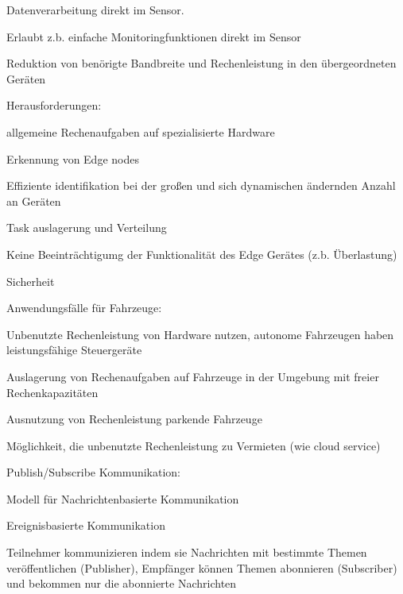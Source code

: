 \begin{notes}
\begin{notes}
\begin{notes}
            \item Datenverarbeitung direkt im Sensor.
            \item Erlaubt z.b. einfache Monitoringfunktionen direkt im Sensor
            \item Reduktion von benörigte Bandbreite und Rechenleistung in den übergeordneten Geräten
        \end{notes}
        \item Herausforderungen:
        \begin{notes}
            \item allgemeine Rechenaufgaben auf spezialisierte Hardware
            \item Erkennung von Edge nodes
            \item Effiziente identifikation bei der großen und sich dynamischen ändernden Anzahl an Geräten
            \item Task auslagerung und Verteilung
            \item Keine Beeinträchtigumg der Funktionalität des Edge Gerätes (z.b. Überlastung)
            \item Sicherheit
        \end{notes}
        \item Anwendungsfälle für Fahrzeuge:
            \begin{notes}
                \item Unbenutzte Rechenleistung von Hardware nutzen, autonome Fahrzeugen haben leistungsfähige Steuergeräte
                \item Auslagerung von Rechenaufgaben auf Fahrzeuge in der Umgebung mit freier Rechenkapazitäten
                \item Ausnutzung von Rechenleistung parkende Fahrzeuge
                \item Möglichkeit, die unbenutzte Rechenleistung zu Vermieten (wie cloud service)
            \end{notes}
        \item Publish/Subscribe Kommunikation:
            \begin{notes}
                \item Modell für Nachrichtenbasierte Kommunikation \cite{MadeWirawan2018}
                \item Ereignisbasierte Kommunikation
                \item Teilnehmer kommunizieren indem sie Nachrichten mit bestimmte Themen veröffentlichen (Publisher), Empfänger können Themen abonnieren (Subscriber) und bekommen nur die abonnierte Nachrichten

\end{notes}
\end{notes}
\end{notes}
